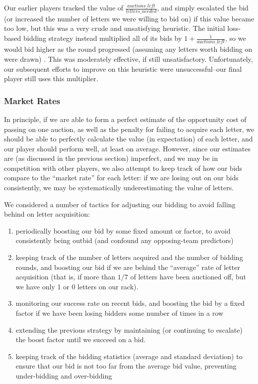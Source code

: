 \documentclass[11pt]{article}
\begin{document}
Our earlier players tracked the value of $\frac{auctions\_left}{letters\_needed}$, and simply escalated the bid (or increased the number of letters we were willing to bid on) if this value became too low, but this was a very crude and unsatisfying heuristic.  The initial loss-based bidding strategy instead multiplied all of its bids by $1+\frac{1}{auctions\_left}$, so we would bid higher as the round progressed (assuming any letters worth bidding on were drawn) .  This was moderately effective, if 
still unsatisfactory.  Unfortunately, our subsequent efforts to improve on this heuristic were unsuccessful--our final player still uses this multiplier. 

\subsubsection{Market Rates}

In principle, if we are able to form a perfect estimate of the opportunity cost of passing on one auction, as well as the penalty for failing to acquire each letter, we should be able to perfectly calculate the value (in expectation) of each letter, and our player should perform well, at least on average.  However, since our estimates are (as discussed in the previous section) imperfect, and we may be in competition with other players, we also attempt to keep track of how our bids compare to the ``market rate'' for each letter: if we are losing out on our bids consistently, we may be systematically underestimating the value of letters.

We considered a number of tactics for adjusting our bidding to avoid falling behind on letter acquisition:

\begin{enumerate}
\item{} periodically boosting our bid by some fixed amount or factor, to avoid consistently being outbid (and confound any opposing-team predictors)
\item{} keeping track of the number of letters acquired and the number of bidding rounds, and boosting our bid if we are behind the ``average'' rate of letter acquisition (that is, if more than $1/7$ of letters have been auctioned off, but we have only 1 or 0 letters on our rack). %
\item monitoring our success rate on recent bids, and boosting the bid by a fixed factor if we have been losing bidders some number of times in a row
\item extending the previous strategy by maintaining (or continuing to escalate) the boost factor until we succeed on a bid.
\item keeping track of the bidding statistics (average and standard deviation) to ensure that our bid is not too far from the average bid value, preventing under-bidding and over-bidding
\end{enumerate}
\end{document}
